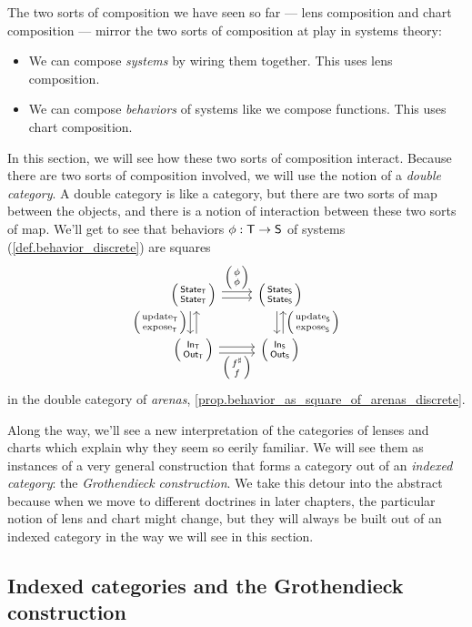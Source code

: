 \documentclass[DynamicalBook]{subfiles}
\begin{document}
The two sorts of composition we have seen so far --- lens composition and chart
composition --- mirror the two sorts of composition at play in systems theory:
\begin{itemize}
  \item We can compose \emph{systems} by wiring them together. This uses lens composition.
  \item We can compose \emph{behaviors} of systems like we compose functions.
    This uses chart composition.
\end{itemize}

In this section, we will see how these two sorts of composition interact.
Because there are two sorts of composition involved, we will use the notion of a
\emph{double category}. A double category is like a category, but there are two
sorts of map between the objects, and there is a notion of interaction between
these two sorts of map. We'll get to see that behaviors $\phi : \mathsf{T} \to
\mathsf{S}$ of systems
(\cref{def.behavior_discrete}) are squares
\[
  \begin{tikzcd}
    \lens{\State{T}}{\State{T}} \ar[r, shift left, "\lens{\phi}{\phi}"] \ar[r,
    shift right]
    \ar[d, shift right, "\lens{\update{T}}{\expose{T}}"'] \ar[d, shift left, leftarrow] &
    \lens{\State{S}}{\State{S}} \ar[d, shift left, leftarrow,
    "\lens{\update{S}}{\expose{S}}"] \ar[d, shift right]\\
    \lens{\In{T}}{\Out{T}} \ar[r, shift right, "\lens{f^{\sharp}}{f}"'] \ar[r,
    shift left] & \lens{\In{S}}{\Out{S}}
  \end{tikzcd}
\]
in the double category of \emph{arenas}, \cref{prop.behavior_as_square_of_arenas_discrete}.

Along the way, we'll see a new interpretation of the categories of lenses and
charts which explain why they seem so eerily familiar. We will see them as
instances of a very general construction that forms a category out of an
\emph{indexed category}: the \emph{Grothendieck construction}. We take this
detour into the abstract because when we move to different doctrines in later
chapters, the particular notion of lens and chart might change, but they will
always be built out of an indexed category in the way we will see in this section.



\subsection{Indexed categories and the Grothendieck construction}\label{sec.indexed_categories}
\end{document}
